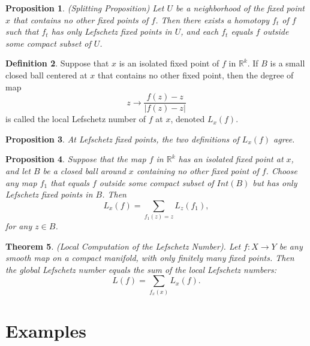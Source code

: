 \documentclass[psamsfonts]{amsart}
\newtheorem{theorem}{Theorem}[section]
\newtheorem{prop}[theorem]{Proposition}
\theoremstyle{definition}
\newtheorem{defn}[theorem]{Definition}
\theoremstyle{remark}
\numberwithin{equation}{section}
\begin{document}
		\begin{prop}(Splitting Proposition)
			Let $U$ be a neighborhood of the fixed point $x$ that contains no other fixed points of $f$. Then there exists a homotopy $f_t$ of $f$ such that $f_t$ has only Lefschetz fixed points in $U$, and each $f_t$ equals $f$ outside some compact subset of $U$.
		\end{prop}
		\begin{defn}
			Suppose that $x$ is an isolated fixed point of $f$ in $\mathbb{R}^k$. If $B$ is a small closed ball centered at $x$ that contains no other fixed point, then the degree of map
			\begin{equation}
				z \to \frac{f(z)-z}{|f(z)-z|}
			\end{equation}
			is called the local Lefschetz number of $f$ at $x$, denoted $L_x(f)$.
		\end{defn}
		\begin{prop}
			At Lefschetz fixed points, the two definitions of $L_x(f)$ agree.
		\end{prop}
		\begin{prop}
			Suppose that the map $f$ in $\mathbb{R}^k$ has an isolated fixed point at $x$, and let $B$ be a closed ball around $x$ containing no other fixed point of $f$. Choose any map $f_1$ that equals $f$ outside some compact subset of $Int(B)$ but has only Lefschetz fixed points in $B$. Then
			\begin{equation}
				L_x(f) = \sum_{f_1(z)=z}L_z(f_1),
			\end{equation}
			for any $z \in B$.
		\end{prop}
		\begin{theorem}(Local Computation of the Lefschetz Number).
			Let $f:X \to Y$ be any smooth map on a compact manifold, with only finitely many fixed points. Then the global Lefschetz number equals the sum of the local Lefschetz numbers:
			\begin{equation}
				L(f) = \sum_{f_x(x)}L_x(f).
			\end{equation}
			
		\end{theorem}
		
	\section{Examples}
	
\end{document}

